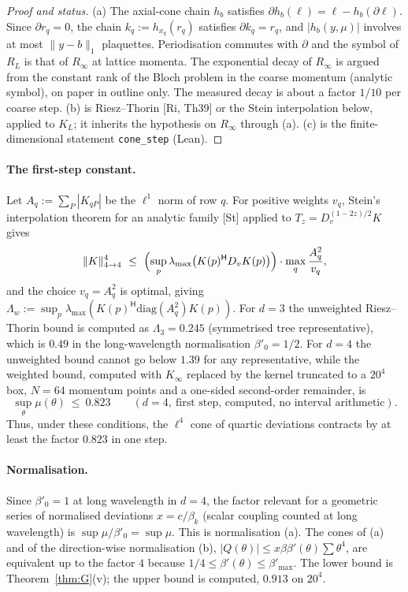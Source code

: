 \documentclass[11pt,a4paper]{article}
\theoremstyle{definition}
\theoremstyle{remark}
\newcommand{\code}[1]{\texttt{#1}}
\begin{document}
\begin{proof}[Proof and status]
(a) The axial-cone chain $h_b$ satisfies $\partial h_b(\ell)=\ell-h_b(\partial\ell)$. Since $\partial r_q=0$, the chain $k_q:=h_{x_q}(r_q)$ satisfies $\partial k_q=r_q$, and $|h_b(y,\mu)|$ involves at most $\|y-b\|_1$ plaquettes. Periodisation commutes with $\partial$ and the symbol of $R_L$ is that of $R_\infty$ at lattice momenta. The exponential decay of $R_\infty$ is argued from the constant rank of the Bloch problem in the coarse momentum (analytic symbol), on paper in outline only. The measured decay is about a factor $1/10$ per coarse step. (b) is Riesz--Thorin [Ri, Th39] or the Stein interpolation below, applied to $K_L$; it inherits the hypothesis on $R_\infty$ through (a). (c) is the finite-dimensional statement \code{cone\_step} (Lean).
\end{proof}

\paragraph{The first-step constant.}
Let $A_q:=\sum_P|K_{qP}|$ be the $\ell^1$ norm of row $q$. For positive weights $v_q$, Stein's interpolation theorem for an analytic family [St] applied to $T_z=D_v^{(1-2z)/2}K$ gives
\[
\|K\|_{4\to4}^4\ \le\ \Bigl(\sup_{p}\lambda_{\max}\bigl(K(p)^{\mathsf H}D_vK(p)\bigr)\Bigr)\cdot\max_q\frac{A_q^2}{v_q},
\]
and the choice $v_q=A_q^2$ is optimal, giving $\Lambda_w:=\sup_p\lambda_{\max}(K(p)^{\mathsf H}\mathrm{diag}(A_q^2)K(p))$.
For $d=3$ the unweighted Riesz--Thorin bound is computed as $\Lambda_3=0.245$ (symmetrised tree representative), which is $0.49$ in the long-wavelength normalisation $\beta'_0=1/2$.
For $d=4$ the unweighted bound cannot go below $1.39$ for any representative, while the weighted bound, computed with $K_\infty$ replaced by the kernel truncated to a $20^4$ box, $N=64$ momentum points and a one-sided second-order remainder, is
\[
\sup_\theta\mu(\theta)\ \le\ 0.823\qquad(d=4,\ \text{first step, computed, no interval arithmetic}).
\]
Thus, under these conditions, the $\ell^4$ cone of quartic deviations contracts by at least the factor $0.823$ in one step.

\paragraph{Normalisation.}
Since $\beta'_0=1$ at long wavelength in $d=4$, the factor relevant for a geometric series of normalised deviations $x=c/\beta_k$ (scalar coupling counted at long wavelength) is $\sup\mu/\beta'_0=\sup\mu$. This is normalisation (a). The cones of (a) and of the direction-wise normalisation (b), $|Q(\theta)|\le x\beta\beta'(\theta)\sum\theta^4$, are equivalent up to the factor $4$ because $1/4\le\beta'(\theta)\le\beta'_{\max}$. The lower bound is Theorem~\ref{thm:G}(v); the upper bound is computed, $0.913$ on $20^4$.
\end{document}
